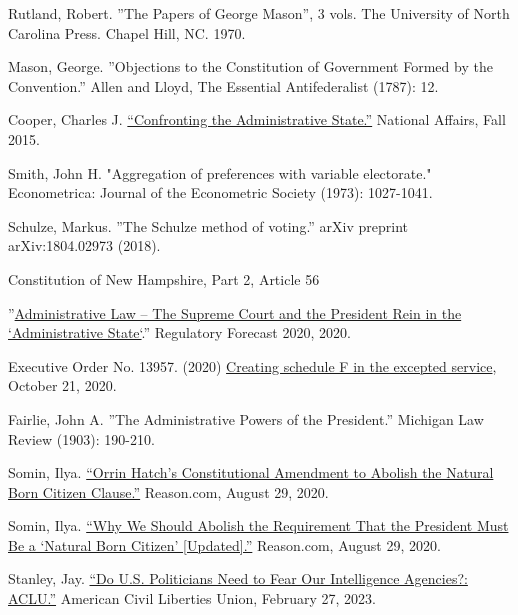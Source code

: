\documentclass{article}
\begin{document}
\begin{thebibliography}{20}
Rutland, Robert. ”The Papers of George Mason”, 3 vols. The University of North Carolina Press. Chapel Hill, NC. 1970.

Mason, George. ”Objections to the Constitution of Government Formed by the Convention.” Allen and Lloyd, The Essential Antifederalist (1787): 12.

Cooper, Charles J. \href{https://www.nationalaffairs.com/publications/detail/confronting-the-administrative-state}{“Confronting the Administrative State.”} National Affairs, Fall 2015.

Smith, John H. "Aggregation of preferences with variable electorate." Econometrica: Journal of the Econometric Society (1973): 1027-1041.

Schulze, Markus. ”The Schulze method of voting.” arXiv preprint arXiv:1804.02973 (2018).

Constitution of New Hampshire, Part 2, Article 56

”\href{https://www.crowell.com/a/web/bomv5ATK9LZPNrBA51skWq/4TtiyY/Regulatory-Forecast-2020-Administrative-Law-Crowell-Moring.pdf }{Administrative Law – The Supreme Court and the President Rein in the `Administrative State`}.” Regulatory Forecast 2020, 2020. 

Executive Order No. 13957. (2020) \href{https://www.
federalregister.gov/documents/2020/10/26/2020-23780/creating-schedule-f-in-the-excepted-service}{Creating schedule F in the excepted service}, October 21, 2020.

Fairlie, John A. ”The Administrative Powers of the President.” Michigan Law Review (1903): 190-210.

Somin, Ilya. \href{https://reason.com/volokh/2020/08/16/orrin-hatchs-constitutional-amendment-to-abolish-the-natural-born-citizen-clause/}{“Orrin Hatch’s Constitutional Amendment to Abolish the Natural Born Citizen Clause.”} Reason.com, August 29, 2020.

Somin, Ilya. \href{https://reason.com/volokh/2020/08/14/why-we-should-abolish-the-requirement-that-the-president-must-be-a-natural-born-citizen/}{“Why We Should Abolish the Requirement That the President Must Be a ‘Natural Born Citizen’ [Updated].”} Reason.com, August 29, 2020. 

Stanley, Jay. \href{https://www.aclu.org/news/national-security/do-us-politicians-need-fear-our-intelligence}{“Do U.S. Politicians Need to Fear Our Intelligence Agencies?: ACLU.”} American Civil Liberties Union, February 27, 2023.


\end{thebibliography}
\end{document}
